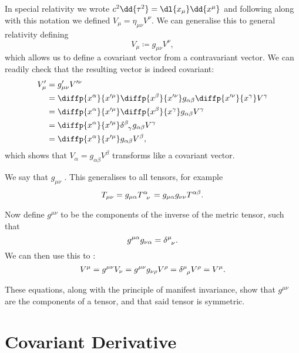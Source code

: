 \documentclass[fleqn]{NotesClass}
\begin{document}
    In special relativity we wrote \(c^2 \dd{\tau^2} = \dl{x_\mu}\dd{x^\mu}\) and following along with this notation we defined \(V_\mu = \eta_{\mu\nu}V^\nu\).
    We can generalise this to general relativity defining
    \begin{equation}
        V_\mu \coloneqq g_{\mu\nu}V^\nu,
    \end{equation}
    which allows us to define a covariant vector from a contravariant vector.
    We can readily check that the resulting vector is indeed covariant:
    \begin{align}
        V'_\mu &= g'_{\mu\nu}V'^\nu\\
        &= \diffp{x^\alpha}{x'^\mu} \diffp{x^\beta}{x'^\nu} g_{\alpha\beta} \diffp{x'^\nu}{x^\gamma} V^\gamma\\
        &= \diffp{x^\alpha}{x'^\mu} \diffp{x^\beta}{x^\gamma} g_{\alpha\beta} V^\gamma\\
        &= \diffp{x^\alpha}{x'^\mu} \tensor{\delta}{^\beta_\gamma} g_{\alpha\beta} V^\gamma\\
        &= \diffp{x^\alpha}{x'^\mu} g_{\alpha\beta} V^\beta,
    \end{align}
    which shows that \(V_\alpha = g_{\alpha\beta}V^\beta\) transforms like a covariant vector.
    
    We say that \(g_{\mu\nu}\) .
    This generalises to all tensors, for example
    \begin{equation}
        T_{\mu\nu} = g_{\mu\alpha}\tensor{T}{^\alpha_\nu} = g_{\mu\alpha}g_{\nu\nu}T^{\alpha\beta}.
    \end{equation}
    
    Now define \(g^{\mu\nu}\) to be the components of the inverse of the metric tensor, such that
    \begin{equation}
        g^{\mu\alpha}g_{\nu\alpha} = \tensor{\delta}{^\mu_\nu}.
    \end{equation}
    We can then use this to :
    \begin{equation}
        V^\mu = g^{\mu\nu}V_\nu = g^{\mu\nu}g_{\nu\rho}V^\rho = \tensor{\delta}{^\mu_\rho} V^\rho = V^\mu.
    \end{equation}
    
    These equations, along with the principle of manifest invariance, show that \(g^{\mu\nu}\) are the components of a tensor, and that said tensor is symmetric.
    
    \chapter{Covariant Derivative}
\end{document}
